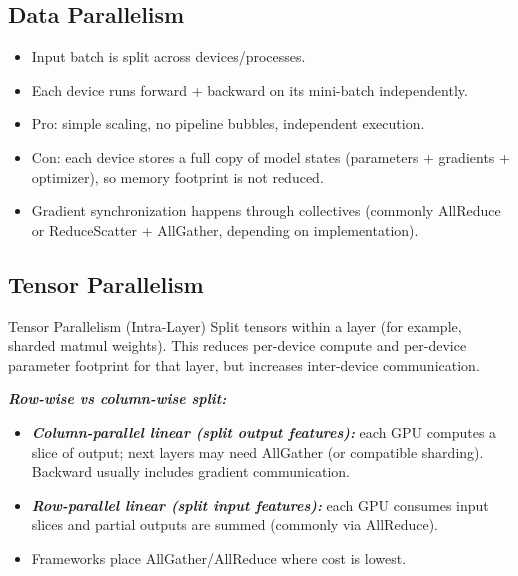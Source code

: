 \documentclass[12pt]{article}
\let\origtextbf\textbf
\renewcommand{\textbf}[1]{\origtextbf{\textit{#1}}}
\begin{document}
\subsection{Data Parallelism}
\begin{itemize}
\item Input batch is split across devices/processes.
\item Each device runs forward + backward on its mini-batch independently.
\item Pro: simple scaling, no pipeline bubbles, independent execution.
\item Con: each device stores a full copy of model states (parameters + gradients + optimizer), so memory footprint is not reduced.
\item Gradient synchronization happens through collectives (commonly AllReduce or ReduceScatter + AllGather, depending on implementation).
\end{itemize}

\subsection{Tensor Parallelism}
\begin{bluebox}{Tensor Parallelism (Intra-Layer)}
Split tensors within a layer (for example, sharded matmul weights). This reduces per-device compute and per-device parameter footprint for that layer, but increases inter-device communication.
\end{bluebox}

\textbf{Row-wise vs column-wise split:}
\begin{itemize}
\item \textbf{Column-parallel linear (split output features):} each GPU computes a slice of output; next layers may need AllGather (or compatible sharding). Backward usually includes gradient communication.
\item \textbf{Row-parallel linear (split input features):} each GPU consumes input slices and partial outputs are summed (commonly via AllReduce).
\item Frameworks place AllGather/AllReduce where cost is lowest.
\end{itemize}
\end{document}
